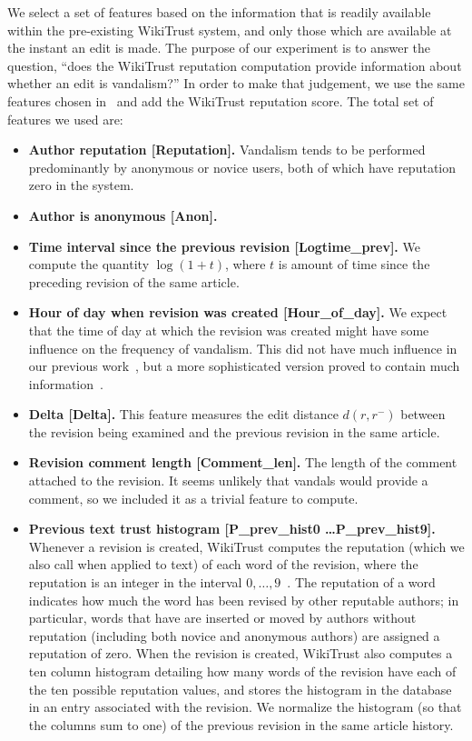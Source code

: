 We select a set of features based on the information that is readily
available within the pre-existing WikiTrust system, and only those which
are available at the instant an edit is made.
The purpose of our experiment is to answer the question,
``does the WikiTrust reputation computation provide information about
whether an edit is vandalism?''
In order to make that judgement, we use the same features chosen
in~\cite{Adler2010b} and add the WikiTrust reputation score.
The total set of features we used are:
%
\begin{itemize}

\item \textbf{Author reputation [Reputation].}
Vandalism tends to be performed
predominantly by anonymous or novice users, both of which have
reputation zero in the system.

\item \textbf{Author is anonymous [Anon].}

\item \textbf{Time interval since the previous revision [Logtime\_prev].}
We compute the quantity $\log(1 + t)$, where $t$ is amount of time since
the preceding revision of the same article.

\item \textbf{Hour of day when revision was created [Hour\_of\_day].}
We expect that the time of day at which the revision was created
might have some influence on the frequency of vandalism.
This did not have much influence in our previous work~\cite{Adler2010b},
but a more sophisticated version proved to contain much
information~\cite{West2010}.

\item \textbf{Delta [Delta].}
This feature measures the edit distance $d(r, r^{-})$ between the
revision being examined and the previous revision in the same article.

\item \textbf{Revision comment length [Comment\_len].}
The length of the comment attached to the revision.
It seems unlikely that vandals would provide a comment,
so we included it as a trivial feature to compute.

\item \textbf{Previous text trust histogram [P\_prev\_hist0 \ldots P\_prev\_hist9].}
Whenever a revision is created, WikiTrust computes the reputation (which
we also call  when applied to text) of each word of the
revision, where the reputation is an
integer in the interval $0, \ldots, 9$~\cite{Adler2008b}.  The
reputation of a word indicates how much the word has been revised by
other reputable authors; in particular, words that have are inserted or
moved by authors without reputation (including both novice and
anonymous authors) are assigned a reputation of zero.  When the revision is
created, WikiTrust also computes a ten column histogram detailing how
many words of the revision have each of the ten possible reputation
values, and stores the histogram in the database in an entry associated
with the revision.
We normalize the histogram (so that
the columns sum to one) of the previous revision in the same article history.


\end{itemize}
